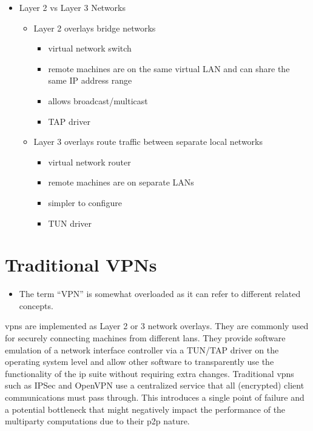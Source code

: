 \begin{itemize}
\tightlist
\item
  Layer 2 vs Layer 3 Networks

  \begin{itemize}
  \tightlist
  \item
    Layer 2 overlays bridge networks

    \begin{itemize}
    \tightlist
    \item
      virtual network switch
    \item
      remote machines are on the same virtual LAN and can share the same
      IP address range
    \item
      allows broadcast/multicast
    \item
      TAP driver
    \end{itemize}
  \item
    Layer 3 overlays route traffic between separate local networks

    \begin{itemize}
    \tightlist
    \item
      virtual network router
    \item
      remote machines are on separate LANs
    \item
      simpler to configure
    \item
      TUN driver
    \end{itemize}
  \end{itemize}
\end{itemize}

\hypertarget{traditional-vpns}{%
\section{Traditional VPNs}\label{traditional-vpns}}


\begin{itemize}
\tightlist
\item
  The term ``VPN'' is somewhat overloaded as it can refer to different
  related concepts.
\end{itemize}

\glspl{vpn} are implemented as Layer 2 or 3 network overlays. They are
commonly used for securely connecting machines from different
\glspl{lan}. They provide software emulation of a network interface
controller via a TUN/TAP driver on the operating system level and allow
other software to transparently use the functionality of the \gls{ip}
suite without requiring extra changes. Traditional \glspl{vpn} such as
IPSec \autocite{ipSecDocs} and OpenVPN \autocite{openVPNDocs} use a
centralized service that all (encrypted) client communications must pass
through. This introduces a single point of failure and a potential
bottleneck that might negatively impact the performance of the
multiparty computations due to their \gls{p2p} nature.

